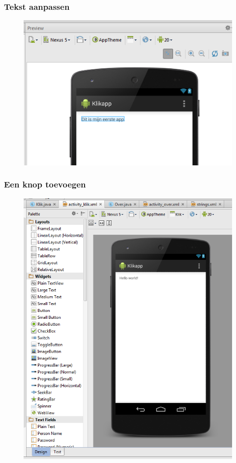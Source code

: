 \documentclass[11pt]{beamer}
\begin{document}
\begin{frame}
\frametitle{Tekst aanpassen}
\begin{figure}
\centering
\includegraphics[height=.9\textheight]{./stringediting3}
\label{fig:stringediting3}
\end{figure}
\end{frame}


\begin{frame}
\frametitle{Een knop toevoegen}
\begin{figure}
\centering
\includegraphics[height=.9\textheight]{./addbutton1}
\label{fig:addbutton1}
\end{figure}
\end{frame}
\end{document}

